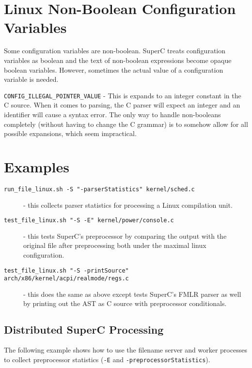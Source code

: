 \documentclass{report}
\begin{document}

\section{Linux Non-Boolean Configuration Variables}

Some configuration variables are non-boolean.  SuperC treats
configuration variables as boolean and the text of non-boolean
expressions become opaque boolean variables.  However, sometimes the
actual value of a configuration variable is needed.

\verb'CONFIG_ILLEGAL_POINTER_VALUE' - This is expands to an integer
constant in the C source.  When it comes to parsing, the C parser will
expect an integer and an identifier will cause a syntax error.  The
only way to handle non-booleans completely (without having to change
the C grammar) is to somehow allow for all possible expansions, which
seem impractical.



\section{Examples}

\begin{description}
\item[\texttt{run\_file\_linux.sh -S "-parserStatistics" kernel/sched.c}] -
  this collects parser statistics for processing a Linux compilation
  unit.
\item[\texttt{test\_file\_linux.sh "-S -E" kernel/power/console.c}] - this
  tests SuperC's preprocessor by comparing the output with the
  original file after preprocessing both under the maximal linux
  configuration.
\item[\texttt{test\_file\_linux.sh "-S -printSource"
  arch/x86/kernel/acpi/realmode/regs.c}] - this does the same as above
  except tests SuperC's FMLR parser as well by printing out the AST as
  C source with preprocessor conditionals.
\end{description}


\subsection*{Distributed SuperC Processing}

The following example shows how to use the filename server and worker
processes to collect preprocessor statistics (\verb"-E" and
\verb"-preprocessorStatistics").
\end{document}
